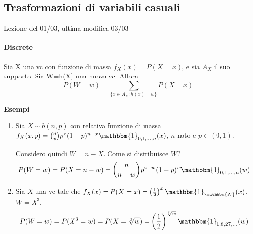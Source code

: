 
\subsection{Trasformazioni di variabili casuali}
Lezione del 01/03, ultima modifica 03/03
\paragraph{Discrete}
\begin{teo}
Sia X una vc con funzione di massa $f_X(x)=P(X=x)$, e sia $A_X$ il suo supporto. 
Sia W=h(X) una nuova vc. Allora $$P(W=w)=\sum_{\{x\in A_X:h(x)=w\}}P(X=x)$$
\end{teo}

\textbf{Esempi}
\begin{enumerate}

\item Sia $X \sim b(n,p)$ con relativa funzione di massa 
$f_X(x,p)=\binom{n}{p}p^x(1-p)^{n-x}\mathbbm{1}_{0,1,...,n}(x)$,
$n$ noto e $p\in(0,1)$.

Considero quindi $W=n-X$. Come si distribuisce $W$? 
$$P(W=w)=P(X=n-w)=\binom{n}{n-w}p^{n-w}(1-p)^w\mathbbm{1}_{0,1,...,n}(w)$$
\item Sia $X$ una vc tale che 
$f_X(x)=P(X=x)=\left(\frac{1}{2}\right)^x\mathbbm{1}_\mathbbm{N}(x)$, $W=X^3$. 
$$P(W=w)=P(X^3=w)=P(X=\sqrt[3]{w})=\left(\frac{1}{2}\right)^{\sqrt[3]{w}}\mathbbm{1}_{1,8,27,...}(w)$$
\end{enumerate}

